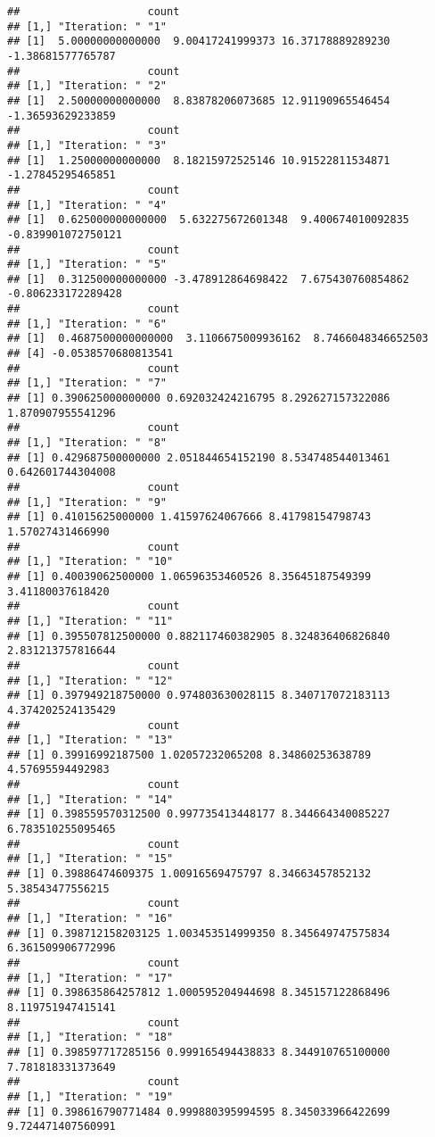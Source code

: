 \documentclass[
]{article}
\begin{document}
\begin{verbatim}
##                    count
## [1,] "Iteration: " "1"  
## [1]  5.00000000000000  9.00417241999373 16.37178889289230 -1.38681577765787
##                    count
## [1,] "Iteration: " "2"  
## [1]  2.50000000000000  8.83878206073685 12.91190965546454 -1.36593629233859
##                    count
## [1,] "Iteration: " "3"  
## [1]  1.25000000000000  8.18215972525146 10.91522811534871 -1.27845295465851
##                    count
## [1,] "Iteration: " "4"  
## [1]  0.625000000000000  5.632275672601348  9.400674010092835 -0.839901072750121
##                    count
## [1,] "Iteration: " "5"  
## [1]  0.312500000000000 -3.478912864698422  7.675430760854862 -0.806233172289428
##                    count
## [1,] "Iteration: " "6"  
## [1]  0.4687500000000000  3.1106675009936162  8.7466048346652503
## [4] -0.0538570680813541
##                    count
## [1,] "Iteration: " "7"  
## [1] 0.390625000000000 0.692032424216795 8.292627157322086 1.870907955541296
##                    count
## [1,] "Iteration: " "8"  
## [1] 0.429687500000000 2.051844654152190 8.534748544013461 0.642601744304008
##                    count
## [1,] "Iteration: " "9"  
## [1] 0.41015625000000 1.41597624067666 8.41798154798743 1.57027431466990
##                    count
## [1,] "Iteration: " "10" 
## [1] 0.40039062500000 1.06596353460526 8.35645187549399 3.41180037618420
##                    count
## [1,] "Iteration: " "11" 
## [1] 0.395507812500000 0.882117460382905 8.324836406826840 2.831213757816644
##                    count
## [1,] "Iteration: " "12" 
## [1] 0.397949218750000 0.974803630028115 8.340717072183113 4.374202524135429
##                    count
## [1,] "Iteration: " "13" 
## [1] 0.39916992187500 1.02057232065208 8.34860253638789 4.57695594492983
##                    count
## [1,] "Iteration: " "14" 
## [1] 0.398559570312500 0.997735413448177 8.344664340085227 6.783510255095465
##                    count
## [1,] "Iteration: " "15" 
## [1] 0.39886474609375 1.00916569475797 8.34663457852132 5.38543477556215
##                    count
## [1,] "Iteration: " "16" 
## [1] 0.398712158203125 1.003453514999350 8.345649747575834 6.361509906772996
##                    count
## [1,] "Iteration: " "17" 
## [1] 0.398635864257812 1.000595204944698 8.345157122868496 8.119751947415141
##                    count
## [1,] "Iteration: " "18" 
## [1] 0.398597717285156 0.999165494438833 8.344910765100000 7.781818331373649
##                    count
## [1,] "Iteration: " "19" 
## [1] 0.398616790771484 0.999880395994595 8.345033966422699 9.724471407560991

\end{verbatim}
\end{document}
